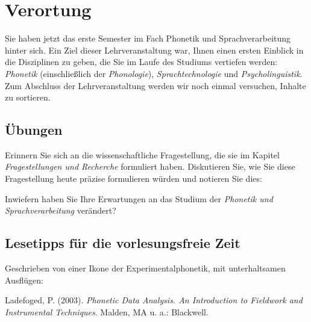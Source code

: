 \chapter{Verortung}

Sie haben jetzt das erste Semester im Fach Phonetik und Sprachverarbeitung hinter sich. Ein Ziel dieser Lehrveranstaltung war, Ihnen einen ersten Einblick in die Disziplinen zu geben, die Sie im Laufe des Studiums vertiefen werden: \emph{Phonetik} (einschließlich der \emph{Phonologie}), \emph{Sprachtechnologie} und \emph{Psycholinguistik}. Zum Abschluss der Lehrveranstaltung werden wir noch einmal versuchen, Inhalte zu sortieren.


\newpage

\section{Übungen}


Erinnern Sie sich an die wissenschaftliche Fragestellung, die sie im Kapitel \emph{Fragestellungen und Recherche} formuliert haben. Diskutieren Sie, wie Sie diese Fragestellung heute präzise formulieren würden und notieren Sie dies:

\vspace{5cm}

Inwiefern haben Sie Ihre Erwartungen an das Studium der \emph{Phonetik und Sprachverarbeitung} verändert?

\vspace{5cm}


\section{Lesetipps für die vorlesungsfreie Zeit}

Geschrieben von einer Ikone der Experimentalphonetik, mit unterhaltsamen Ausflügen:

Ladefoged, P. (2003). \emph{Phonetic Data Analysis. An Introduction to Fieldwork and Instrumental Techniques}. Malden, MA u. a.: Blackwell.
